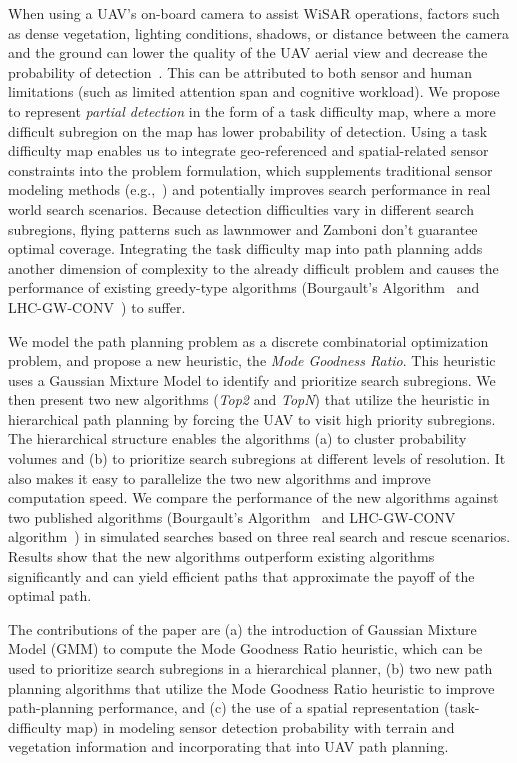 When using a UAV's on-board camera to assist WiSAR operations, factors such as dense vegetation, lighting conditions, shadows, or distance between the camera and the ground can lower the quality of the UAV aerial view and decrease the probability of detection~\cite{Morse2010UAV}. This can be attributed to both sensor and human limitations (such as limited attention span and cognitive workload). We propose to represent \textit{partial detection} in the form of a task difficulty map, where a more difficult subregion on the map has lower probability of detection. Using a task difficulty map enables us to integrate geo-referenced and spatial-related sensor constraints into the problem formulation, which supplements traditional sensor modeling methods (e.g.,~\cite{Bourgault2006Optimal}) and potentially improves search performance in real world search scenarios. Because detection difficulties vary in different search subregions, flying patterns such as lawnmower and Zamboni don't guarantee optimal coverage. Integrating the task difficulty map into path planning adds another dimension of complexity to the already difficult problem and causes the performance of existing greedy-type algorithms (Bourgault's Algorithm~\cite{Bourgault2006Optimal} and LHC-GW-CONV~\cite{Lin2009UAV}) to suffer.

We model the path planning problem as a discrete combinatorial optimization problem, and propose a new heuristic, the \textit{Mode Goodness Ratio}. This heuristic uses a Gaussian Mixture Model to identify and prioritize search subregions. We then present two new algorithms (\textit{Top2} and \textit{TopN}) that utilize the heuristic in hierarchical path planning by forcing the UAV to visit high priority subregions. The hierarchical structure enables the algorithms (a) to cluster probability volumes and (b) to prioritize search subregions at different levels of resolution. It also makes it easy to parallelize the two new algorithms and improve computation speed. We compare the performance of the new algorithms against two published algorithms (Bourgault's Algorithm~\cite{Bourgault2006Optimal} and LHC-GW-CONV algorithm~\cite{Lin2009UAV}) in simulated searches based on three real search and rescue scenarios. Results show that the new algorithms outperform existing algorithms significantly and can yield efficient paths that approximate the payoff of the optimal path.

The contributions of the paper are (a) the introduction of Gaussian Mixture Model (GMM) to compute the Mode Goodness Ratio heuristic, which can be used to prioritize search subregions in a hierarchical planner, (b) two new path planning algorithms that utilize the Mode Goodness Ratio heuristic to improve path-planning performance, and (c) the use of a spatial representation (task-difficulty map) in modeling sensor detection probability with terrain and vegetation information and incorporating that into UAV path planning.

